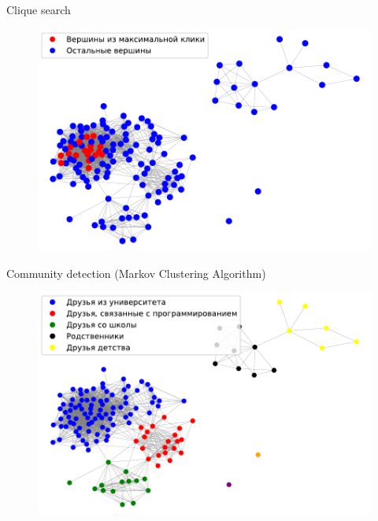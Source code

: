 \documentclass{beamer}
\begin{document}
\begin{frame} {Clique search}
\begin{figure}[h!t]\center
\includegraphics[width=1\textwidth]{clique.pdf}
\label{fig9}
\end{figure}
\end{frame}

\begin{frame} {Community detection (Markov Clustering Algorithm)}
\begin{figure}[h!t]\center
\includegraphics[width=1\textwidth]{clusters.pdf}
\label{fig9}
\end{figure}
\end{frame}
\end{document}
